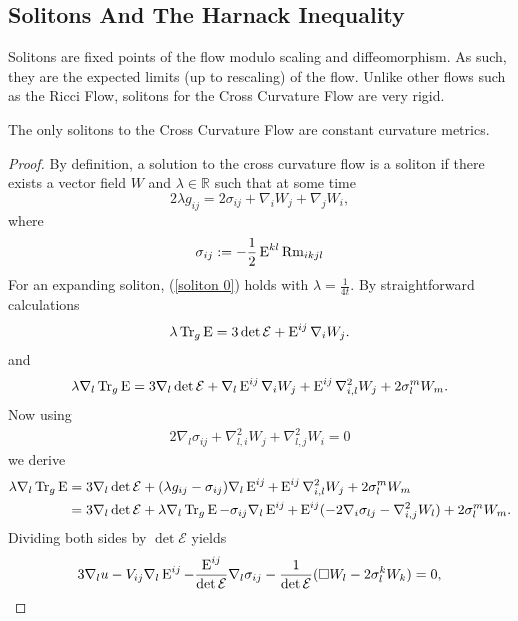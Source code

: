 \documentclass[a4paper, 12pt]{amsart}
\begin{document}
\subsection{Solitons And The Harnack Inequality}
\label{subsec:xcf_solitons}
Solitons are fixed points of the flow modulo scaling and diffeomorphism. As such, they are the expected limits (up to rescaling) of the flow. Unlike other flows such as the Ricci Flow, solitons for the Cross Curvature Flow are very rigid.
\begin{lemma}
The only solitons to the Cross Curvature Flow are constant curvature metrics.
\end{lemma}
\begin{proof}
By definition, a solution to the cross curvature flow is a soliton if there exists a vector field $W$ and $\lambda\in \mathbb{R}$ such that at some time
\begin{equation}\label{soliton 0}
2\lambda g_{ij}=2\sigma_{ij}+\nabla_iW_j+\nabla_jW_i,
\end{equation}
where \begin{equation}
\sigma_{ij}:=-\frac{1}{2}\operatorname{E}^{kl}\operatorname{Rm}_{ikjl}
\end{equation}
For an expanding soliton, (\ref{soliton 0}) holds with $\lambda=\frac{1}{4t}.$ By straightforward calculations
\begin{align}\label{trace}
\lambda \operatorname{Tr}_g \operatorname{E}=3\det \mathcal{E}+\operatorname{E}^{ij}\nabla_iW_j.
\end{align}
and
\begin{align}\label{equ00}
\lambda \nabla_l \operatorname{Tr}_g \operatorname{E}=3\nabla_l\det \mathcal{E}+\nabla_l \operatorname{E}^{ij}\nabla_iW_j+\operatorname{E}^{ij}\nabla^2_{i,l}W_j+2\sigma_l^mW_m.
\end{align}
Now using 
\begin{align}\label{eq: soliton derv}
2\nabla_l\sigma_{ij}+\nabla^2_{l,i}W_j+\nabla^2_{l,j}W_i=0
\end{align}
we derive
\begin{align}
\lambda \nabla_l \operatorname{Tr}_g \operatorname{E}&=3\nabla_l\det \mathcal{E}+(\lambda g_{ij}-\sigma_{ij})\nabla_l \operatorname{E}^{ij}+\operatorname{E}^{ij}\nabla^2_{i,l}W_j+2\sigma_l^mW_m\nonumber\\
&=3\nabla_l\det \mathcal{E}+\lambda \nabla_l \operatorname{Tr}_g \operatorname{E}-\sigma_{ij}\nabla_l \operatorname{E}^{ij}+\operatorname{E}^{ij}(-2\nabla_i\sigma_{lj}-\nabla^2_{i,j}W_l)+2\sigma_l^mW_m.
\end{align}
Dividing both sides by $\det \mathcal{E}$ yields
\begin{align}
3\nabla_lu-V_{ij}\nabla_l \Ein^{ij}-\frac{\Ein^{ij}}{\det \mathcal{E}}\nabla_l\sigma_{ij}-\frac{1}{\det \mathcal{E}}(\Box W_l-2\sigma_l^kW_k)=0,

\end{align}
\end{proof}
\end{document}

